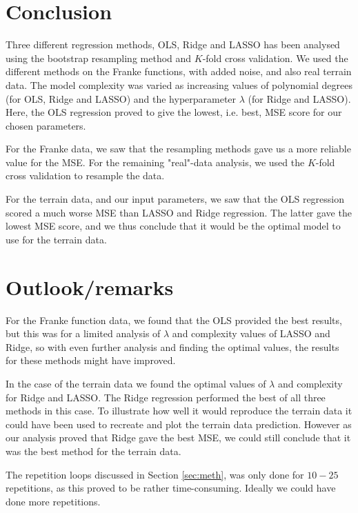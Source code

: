 \documentclass[norsk,a4paper,12pt]{article}
\begin{document}
\begin{multicols}{2}
\section{Conclusion}\label{sec:conclusion}
Three different regression methods, OLS, Ridge and LASSO has been analysed using the bootstrap resampling method and  $K$-fold cross validation. We used the different methods on the Franke functions, with added noise, and also real terrain data. The model complexity was varied as increasing values of polynomial degrees (for OLS, Ridge and LASSO) and the hyperparameter $\lambda$ (for Ridge and LASSO). Here, the OLS regression proved to give the lowest, i.e. best, MSE score for our chosen parameters. 

For the Franke data, we saw that the resampling methods gave us a more reliable value for the MSE. For the remaining "real"-data analysis, we used the $K$-fold cross validation to resample the data.

For the terrain data, and our input parameters, we saw that the OLS regression scored a much worse MSE than LASSO and Ridge regression. The latter gave the lowest MSE score, and we thus conclude that it would be the optimal model to use for the terrain data.

\section{Outlook/remarks}\label{sec:outlooks}
For the Franke function data, we found that the OLS provided the best results, but this was for a limited analysis of $\lambda$ and complexity values of LASSO and Ridge, so with even further analysis and finding the optimal values, the results for these methods might have improved.

In the case of the terrain data we found the optimal values of $\lambda$ and complexity for Ridge and LASSO. The Ridge regression performed the best of all three methods in this case. To illustrate how well it would reproduce the terrain data it could have been used to recreate and plot the terrain data prediction. However as our analysis proved that Ridge gave the best MSE, we could still conclude that it was the best method for the terrain data. 

The repetition loops discussed in Section \ref{sec:meth}, was only done for $10-25$ repetitions, as this proved to be rather time-consuming. Ideally we could have done more repetitions.

\newpage


\appendix

\end{multicols}
\end{document}
